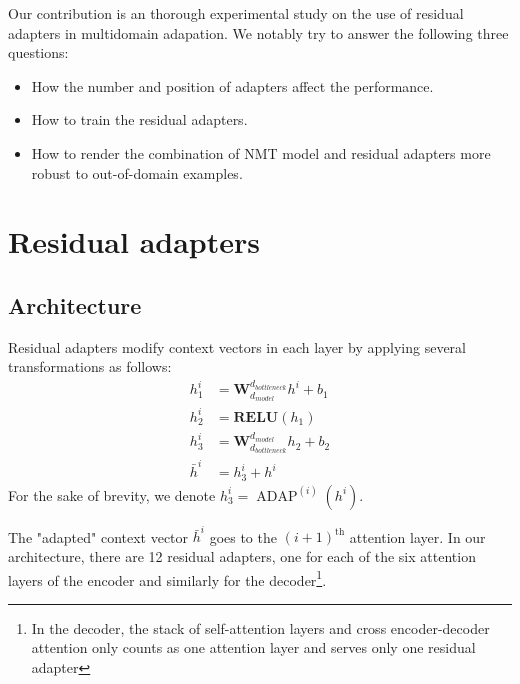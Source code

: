 \documentclass[11pt,a4paper]{article}
\newcommand{\fyTodo}[1]{\Todo[FY:]{\textcolor{orange}{#1}}}
\newcommand{\fyDone}[1]{\done[FY]\Todo[FY:]{\textcolor{orange}{#1}}}
\begin{document}
Our contribution is an thorough experimental study on the use of residual adapters in multidomain adapation. We notably try to answer the following three questions:
\begin{itemize}
\item How the number and position of adapters affect the performance.
\item How to train the residual adapters.
\item How to render the combination of NMT model and residual adapters more robust to out-of-domain examples.
\end{itemize}
\fyTodo{One bit of a conclusion here}

\section{Residual adapters \label{sec:res}}

\subsection{Architecture \label{ssec:architecture}}
\fyTodo{More contexts and notations from the transformer}

Residual adapters modify context vectors in each layer by applying several transformations as follows:\fyTodo{Use align env}
\begin{align*}
  h^{i}_1 &= \mathbf{W}_{d_{model}}^{d_{bottleneck}}h^{i} + b_{1} \\
  h^{i}_2 &= \mathbf{RELU}(h_1) \\
  h^{i}_3 &= \mathbf{W}_{d_{bottleneck}}^{d_{model}}h_2 + b_{2} \\
  \bar{h}^{i} &= h^i_3 + h^i
\end{align*}
For the sake of brevity, we denote $h^i_3 = \operatorname{ADAP}^{(i)}(h^i)$.\fyDone{or is it $h_i$ ?}

The "adapted" context vector $\bar{h}^i$ goes to\fyTodo{Is the output of ?} the $(i+1)^{\text{th}}$ attention\fyDone{Self attention ?} layer. In our architecture, there are 12 residual adapters, one for each of the six attention layers of the encoder and similarly for the decoder\footnote{In the decoder, the stack of self-attention layers and cross encoder-decoder attention only counts as one attention layer and serves only one residual adapter}.
\end{document}
